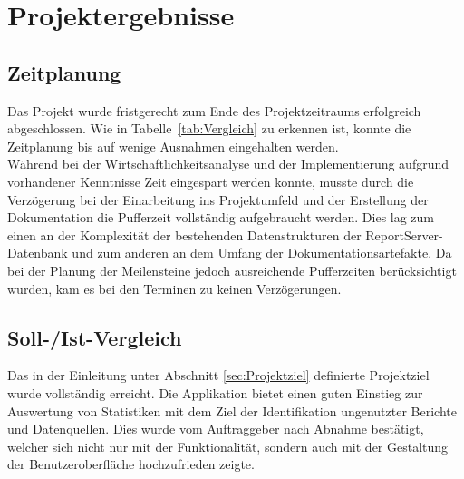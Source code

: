 \section{Projektergebnisse}\label{sec:Projektergebnisse}

\subsection{Zeitplanung}\label{sec:Zeitplanung}
Das Projekt wurde fristgerecht zum Ende des Projektzeitraums erfolgreich abgeschlossen. Wie in Tabelle~\ref{tab:Vergleich} zu erkennen ist, konnte die Zeitplanung bis auf wenige Ausnahmen eingehalten werden.
\\
Während bei der Wirtschaftlichkeitsanalyse und der Implementierung aufgrund vorhandener Kenntnisse Zeit eingespart werden konnte, musste durch die Verzögerung bei der Einarbeitung ins Projektumfeld und der Erstellung der Dokumentation die Pufferzeit vollständig aufgebraucht werden. Dies lag zum einen an der Komplexität der bestehenden Datenstrukturen der ReportServer-Datenbank und zum anderen an dem Umfang der Dokumentationsartefakte. Da bei der Planung der Meilensteine jedoch ausreichende Pufferzeiten berücksichtigt wurden, kam es bei den Terminen zu keinen Verzögerungen.

\subsection{Soll-/Ist-Vergleich}\label{sec:SollIstVergleich}
Das in der Einleitung unter Abschnitt \ref{sec:Projektziel} definierte Projektziel wurde vollständig erreicht. Die Applikation bietet einen guten Einstieg zur Auswertung von Statistiken mit dem Ziel der Identifikation ungenutzter Berichte und Datenquellen. Dies wurde vom Auftraggeber nach Abnahme bestätigt, welcher sich nicht nur mit der Funktionalität, sondern auch mit der Gestaltung der Benutzeroberfläche hochzufrieden zeigte.

